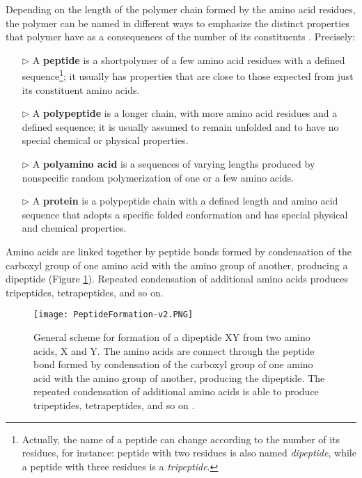 Depending on the length of the polymer chain formed by the amino acid residues, the polymer can be named in different ways to emphasize the distinct properties that polymer have as a consequences of the number of its constituents
\cite{creighton2010biophysical}.
Precisely:
\begin{itemize}
\item[$\triangleright$] A \textbf{peptide} is a shortpolymer of a few amino acid residues with a defined sequence\footnote{Actually, the name of a peptide can change according to the number of its residues, for instance: peptide with two residues is also named \textit{dipeptide}, while a peptide with three residues is a \textit{tripeptide}.}; it usually has properties that are close to those expected from just its constituent amino acids.
\item[$\triangleright$] A \textbf{polypeptide} is a longer chain, with more amino acid residues and a defined sequence; it is usually assumed to remain unfolded and to have no special chemical or physical properties. 
\item[$\triangleright$] A \textbf{polyamino acid} is a sequences of varying lengths produced by nonspecific random polymerization of one or a few amino acids.
\item[$\triangleright$] A \textbf{protein} is a polypeptide chain with a defined length and amino acid sequence that adopts a specific folded conformation and has special physical and chemical properties.
\end{itemize}

Amino acids are linked together by peptide bonds formed by condensation of the carboxyl group of one amino acid with the amino group of another, producing a dipeptide (Figure \ref{fig:PeptideFormation}). Repeated condensation of additional amino acids produces tripeptides, tetrapeptides, and so on.

\begin{figure}[h]
\centering
\begin{minipage}[t]{\textwidth}
\centering
\texttt{[image: PeptideFormation-v2.PNG]}

\caption{\small{General scheme for formation of a dipeptide XY from two amino acids, X and Y. The amino acids are connect through the peptide bond formed by condensation of the carboxyl group of one amino acid with the amino group of another, producing the dipeptide. The repeated condensation of additional amino acids is able to produce tripeptides, tetrapeptides, and so on \cite{creighton2010biophysical}.}}

\label{fig:PeptideFormation}
\end{minipage} 
\end{figure}

